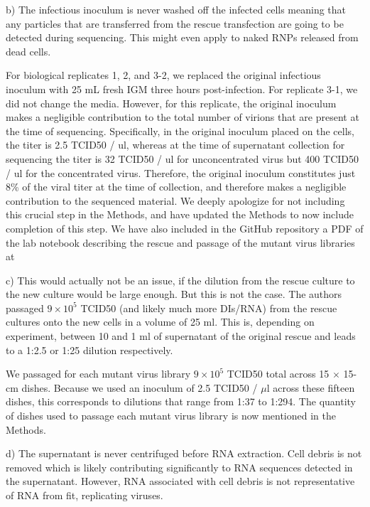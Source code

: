 \documentclass[11pt, oneside]{article}   	%
\newcommand{\response}[1]{{\color{black}#1}}
\begin{document}
b) The infectious inoculum is never washed off the infected cells meaning that any particles that are transferred from the rescue transfection are going to be detected during sequencing. This might even apply to naked RNPs released from dead cells. 

\response{For biological replicates 1, 2, and 3-2, we replaced the original infectious inoculum with 25 mL fresh IGM three hours post-infection.
For replicate 3-1, we did not change the media. 
However, for this replicate, the original inoculum makes a negligible contribution to the total number of virions that are present at the time of sequencing.
Specifically, in the original inoculum placed on the cells, the titer is 2.5 TCID50 / ul, whereas at the time of supernatant collection for sequencing the titer is 32 TCID50 / ul for unconcentrated virus but 400 TCID50 / ul for the concentrated virus.
Therefore, the original inoculum constitutes just 8\% of the viral titer at the time of collection, and therefore makes a negligible contribution to the sequenced material.
We deeply apologize for not including this crucial step in the Methods, and have updated the Methods to now include completion of this step. 
We have also included in the GitHub repository a PDF of the lab notebook describing the rescue and passage of the mutant virus libraries at %
}

c) This would actually not be an issue, if the dilution from the rescue culture to the new culture would be large enough. But this is not the case. The authors passaged $9\times10^5$ TCID50 (and likely much more DIs/RNA) from the rescue cultures onto the new cells in a volume of 25 ml. This is, depending on experiment, between 10 and 1 ml of supernatant of the original rescue and leads to a 1:2.5 or 1:25 dilution respectively. 

\response{We passaged for each mutant virus library $9\times10^5$ TCID50 total across 15 $\times$ 15-cm dishes.
Because we used an inoculum of 2.5 TCID50 / $\mu$l across these fifteen dishes, this corresponds to dilutions that range from 1:37 to 1:294.
The quantity of dishes used to passage each mutant virus library is now mentioned in the Methods.
}

d) The supernatant is never centrifuged before RNA extraction. Cell debris is not removed which is likely contributing significantly to RNA sequences detected in the supernatant. However, RNA associated with cell debris is not representative of RNA from fit, replicating viruses. 
\end{document}
